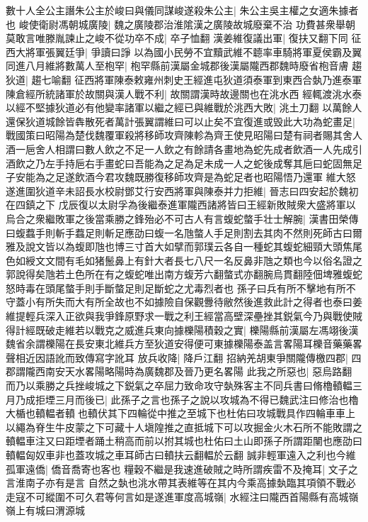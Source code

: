 數十人全公主譖朱公主於峻曰與儀同謀峻遂殺朱公主|{
	朱公主吳主權之女適朱據者也}
峻使衛尉馮朝城廣陵|{
	魏之廣陵郡治淮隂漢之廣陵故城廢棄不治}
功費甚衆舉朝莫敢言唯滕胤諫止之峻不從功卒不成|{
	卒子恤翻}
漢姜維復議出軍|{
	復扶又翻下同}
征西大將軍張翼廷爭|{
	爭讀曰諍}
以為國小民勞不宜黷武維不聼率車騎將軍夏侯霸及翼同進八月維將數萬人至枹罕|{
	枹罕縣前漢屬金城郡後漢屬隴西郡魏時廢省枹音膚}
趨狄道|{
	趨七喻翻}
征西將軍陳泰敕雍州刺史王經進屯狄道須泰軍到東西合埶乃進泰軍陳倉經所統諸軍於故關與漢人戰不利|{
	故關謂漢時故邊關也在洮水西}
經輒渡洮水泰以經不堅據狄道必有他變率諸軍以繼之經已與維戰於洮西大敗|{
	洮土刀翻}
以萬餘人還保狄道城餘皆犇散死者萬計張翼謂維曰可以止矣不宜復進或毁此大功為蛇畫足|{
	戰國策曰昭陽為楚伐魏覆軍殺將移師攻齊陳軫為齊王使見昭陽曰楚有祠者賜其舍人酒一巵舍人相謂曰數人飲之不足一人飲之有餘請各畫地為蛇先成者飲酒一人先成引酒飲之乃左手持巵右手畫蛇曰吾能為之足為足未成一人之蛇後成奪其巵曰蛇固無足子安能為之足遂飲酒今君攻魏既勝復移師攻齊是為蛇足者也昭陽悟乃還軍}
維大怒遂進圍狄道辛未詔長水校尉鄧艾行安西將軍與陳泰并力拒維|{
	晉志曰四安起於魏初在四鎮之下}
戊辰復以太尉孚為後繼泰進軍隴西諸將皆曰王經新敗賊衆大盛將軍以烏合之衆繼敗軍之後當乘勝之鋒殆必不可古人有言蝮蛇螫手壮士解腕|{
	漢書田榮傳曰蝮蠚手則斬手蠚足則斬足應劭曰蝮一名虺螫人手足則割去其肉不然則死師古曰爾雅及說文皆以為蝮即虺也博三寸首大如擘而郭璞云各自一種蛇其蝮蛇細頸大頭焦尾色如綬文文間有毛如猪鬛鼻上有針大者長七八尺一名反鼻非虺之類也今以俗名證之郭說得矣虺若土色所在有之蝮蛇唯出南方蝮芳六翻螫式亦翻腕烏貫翻陸佃埤雅蝮蛇怒時毒在頭尾螫手則手斷螫足則足斷蛇之尤毒烈者也}
孫子曰兵有所不擊地有所不守蓋小有所失而大有所全故也不如據險自保觀釁待敝然後進救此計之得者也泰曰姜維提輕兵深入正欲與我爭鋒原野求一戰之利王經當高壁深壘挫其鋭氣今乃與戰使賊得計經既破走維若以戰克之威進兵東向據櫟陽積穀之實|{
	櫟陽縣前漢屬左馮翊後漢魏省余謂櫟陽在長安東北維兵方至狄道安得便可東據櫟陽泰盖言畧陽耳櫟音藥藥畧聲相近因語訛而致傳寫字訛耳}
放兵收降|{
	降戶江翻}
招納羌胡東爭關隴傳檄四郡|{
	四郡謂隴西南安天水畧陽略陽時為廣魏郡及晉乃更名畧陽}
此我之所惡也|{
	惡烏路翻}
而乃以乘勝之兵挫峻城之下鋭氣之卒屈力致命攻守埶殊客主不同兵書曰脩櫓轒輼三月乃成拒堙三月而後已|{
	此孫子之言也孫子之說以攻城為不得已魏武注曰修治也櫓大楯也轒輼者轒也轒伏其下四輪從中推之至城下也杜佑曰攻城戰具作四輪車車上以繩為脊生牛皮蒙之下可藏十人塡隍推之直抵城下可以攻掘金火木石所不能敗謂之轒輼車注又曰距堙者踊土稍高而前以拊其城也杜佑曰土山即孫子所謂距闉也應劭曰轒輼匈奴車非也蓋攻城之車耳師古曰轒扶云翻輼於云翻}
誠非輕軍遠入之利也今維孤軍遠僑|{
	僑音喬寄也客也}
糧穀不繼是我速進破賊之時所謂疾雷不及掩耳|{
	文子之言淮南子亦有是言}
自然之埶也洮水帶其表維等在其内今乘高據埶臨其項領不戰必走寇不可縱圍不可久君等何言如是遂進軍度高城嶺|{
	水經注曰隴西首陽縣有高城嶺嶺上有城曰渭源城}

